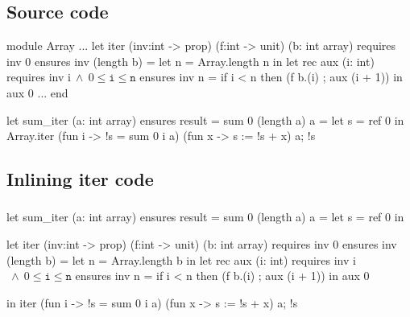 \documentclass[xcolor=dvipsnames]{beamer}
\newcommand{\bwedge}{\boldsymbol{~\wedge~}}
\begin{document}
\subsection*{Source code}
\begin{frame}[fragile]
\vspace*{0em}
\begin{footnotesize}
\begin{whycode} 
module Array 
... 
   let iter (inv:int -> prop) (f:int -> unit) (b: int array)
   requires { inv 0 } 
   ensures  { inv (length b) } 
   = let n = Array.length n in
     let rec aux (i: int)
     requires { inv i$\bwedge 0 \leq \texttt{i} \leq \texttt{n}$ }
     ensures  { inv n }
     = if i < n
       then (f b.(i) ; aux (i + 1)) 
     in aux 0
...
end

let sum_iter (a: int array) 
ensures { result = sum 0 (length a) a }
= let s = ref 0 in
  Array.iter 
    (fun i -> !s = sum 0 i a) (fun x -> s := !s + x) a; 
  !s
\end{whycode} 
\end{footnotesize}
\end{frame}
\addtocounter{framenumber}{-1}

\subsection*{Inlining iter code}
\begin{frame}[fragile]
\frametitle{}
\vspace*{0em}
\begin{footnotesize}
\begin{whygray}
let sum_iter (a: int array) 
ensures { result = sum 0 (length a) a }
= let s = ref 0 in 
\end{whygray}\vspace*{-1.15em} 
\begin{whycode}
  let iter (inv:int -> prop) (f:int -> unit) (b: int array)
  requires { inv 0 } 
  ensures  { inv (length b) } 
  = let n = Array.length b in
    let rec aux (i: int)
    requires { inv i$\bwedge 0 \leq \texttt{i} \leq \texttt{n}$ }
    ensures  { inv n }
    = if i < n
      then (f b.(i) ; aux (i + 1)) 
    in aux 0 \end{whycode} \vspace*{-1.15em} 
 \begin{whygray}
  in iter (fun i -> !s = sum 0 i a) (fun x -> s := !s + x) a; 
  !s
\end{whygray}
\end{footnotesize}
\end{frame}
\addtocounter{framenumber}{-1}
\end{document}
